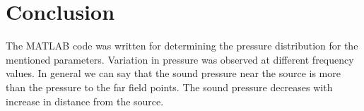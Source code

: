 \chapter*{Conclusion}

\noindent The MATLAB code was written for determining the pressure distribution for the mentioned parameters. Variation in pressure was observed at different frequency values. In general we can say that the sound pressure near the source is more than the pressure to the far field points. The sound pressure decreases with increase in distance from the source. 